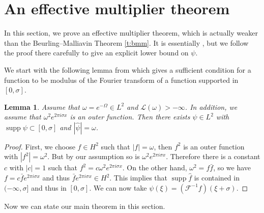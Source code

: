 \documentclass[reqno,12pt,letterpaper]{amsart}
\newtheorem{lem}[prop]{Lemma}
\numberwithin{equation}{section}
\numberwithin{prop}{section}
\DeclareMathOperator{\supp}{supp}
\begin{document}

\section{An effective multiplier theorem}
\label{s:effbmm}


In this section, we prove an effective multiplier theorem, which is actually weaker than the Beurling--Malliavin Theorem \ref{t:bmm}. It is essentially \cite[Theorem 1]{bm7}, but we follow the proof there carefully to give an explicit lower bound on $\psi$.

We start with the following lemma from \cite[\S 1.9]{bm7} which gives a sufficient condition for a function to be modulus of the Fourier transform of a function supported in $[0,\sigma]$. 

\begin{lem}
\label{p:modulus}
Assume that $\omega=e^{-\Omega}\in L^2$ and $\mathcal{L}(\omega)>-\infty$. In addition, we assume that $\omega^2e^{2\pi i\sigma x}$ is an outer function. Then there exists $\psi\in L^2$ with $\supp\psi\subset[0,\sigma]$ and $|\widehat{\psi}|=\omega$.
\end{lem}
\begin{proof}
First, we choose $f\in H^2$ such that $|f|=\omega$, then $f^2$ is an outer function with $|f^2|=\omega^2$. But by our assumption so is $\omega^2e^{2\pi i\sigma x}$. Therefore there is a constant $c$ with $|c|=1$ such that $f^2=c\omega^2e^{2\pi i\sigma x}$. On the other hand, $\omega^2=f\bar{f}$, so we have $f=c\bar{f}e^{2\pi i\sigma x}$ and thus $\bar{f}e^{2\pi i\sigma x}\in H^2$. This implies that $\supp\widehat{f}$ is contained in $(-\infty,\sigma]$ and thus in $[0,\sigma]$. We can now take $\psi(\xi)=(\mathcal{F}^{-1}f)(\xi+\sigma)$.
\end{proof}


Now we can state our main theorem in this section.
\end{document}

